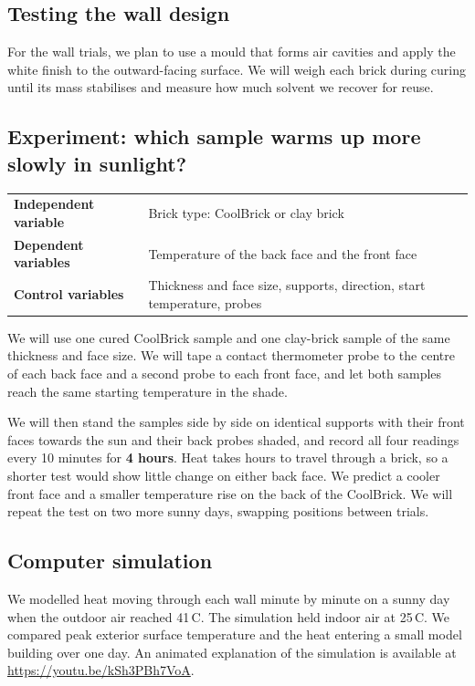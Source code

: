 \documentclass[11pt,a4paper]{article}
\begin{document}
\subsection{Testing the wall design}
For the wall trials, we plan to use a mould that forms air cavities and apply
the white finish to the outward-facing surface. We will weigh each brick
during curing until its mass stabilises and measure how much solvent we
recover for reuse.

\subsection{Experiment: which sample warms up more slowly in sunlight?}
\begin{center}
\begin{tabularx}{\textwidth}{@{}>{\bfseries}p{4.3cm}X@{}}
\toprule
Independent variable & Brick type: CoolBrick or clay brick \\
Dependent variables & Temperature of the back face and the front face \\
Control variables & Thickness and face size, supports, direction, start temperature, probes \\
\bottomrule
\end{tabularx}
\end{center}
We will use one cured CoolBrick sample and one clay-brick sample of the same
thickness and face size. We will tape a contact thermometer probe to the
centre of each back face and a second probe to each front face, and let both
samples reach the same starting temperature in the shade.

We will then stand the samples side by side on identical supports with their
front faces towards the sun and their back probes shaded, and record all four
readings every 10 minutes for \textbf{4 hours}. Heat takes hours to travel
through a brick, so a shorter test would show little change on either back
face. We predict a cooler front face and a smaller temperature rise on the
back of the CoolBrick. We will repeat the test on two more sunny days,
swapping positions between trials.

\subsection{Computer simulation}
We modelled heat moving through each wall minute by minute on a sunny day when
the outdoor air reached 41\,\textdegree C. The simulation held indoor air at 25\,\textdegree C. We
compared peak exterior surface temperature and the heat entering a small model
building over one day.
An animated explanation of the simulation is available at
\url{https://youtu.be/kSh3PBh7VoA}.
\end{document}
